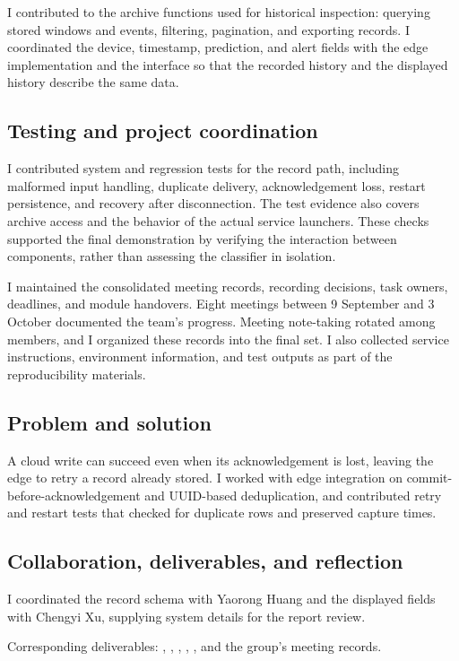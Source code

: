 \documentclass[conference,a4paper]{IEEEtran}
\newenvironment{evidence}{\par\smallskip\begingroup\footnotesize\raggedright\noindent}{\par\endgroup}
\begin{document}
I contributed to the archive functions used for historical inspection: querying stored windows and events, filtering, pagination, and exporting records. I coordinated the device, timestamp, prediction, and alert fields with the edge implementation and the interface so that the recorded history and the displayed history describe the same data.

\subsection{Testing and project coordination}

I contributed system and regression tests for the record path, including malformed input handling, duplicate delivery, acknowledgement loss, restart persistence, and recovery after disconnection. The test evidence also covers archive access and the behavior of the actual service launchers. These checks supported the final demonstration by verifying the interaction between components, rather than assessing the classifier in isolation.

I maintained the consolidated meeting records, recording decisions, task owners, deadlines, and module handovers. Eight meetings between 9 September and 3 October documented the team's progress. Meeting note-taking rotated among members, and I organized these records into the final set. I also collected service instructions, environment information, and test outputs as part of the reproducibility materials.

\subsection{Problem and solution}

A cloud write can succeed even when its acknowledgement is lost, leaving the edge to retry a record already stored. I worked with edge integration on commit-before-acknowledgement and UUID-based deduplication, and contributed retry and restart tests that checked for duplicate rows and preserved capture times.

\subsection{Collaboration, deliverables, and reflection}

I coordinated the record schema with Yaorong Huang and the displayed fields with Chengyi Xu, supplying system details for the report review. \begin{evidence}
Corresponding deliverables: , , , , , and the group's meeting records.
\end{evidence}
\end{document}

